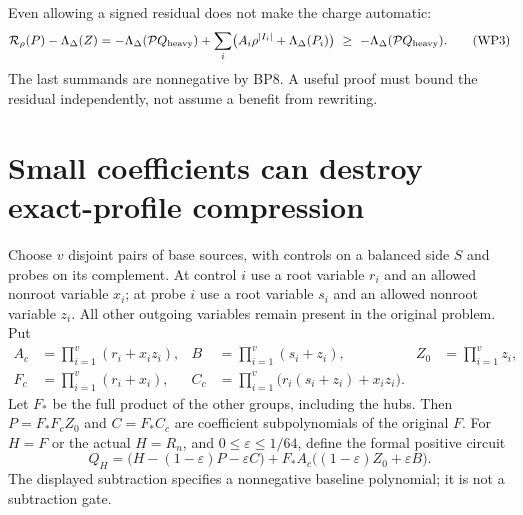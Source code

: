 \documentclass[11pt]{article}
\newcommand{\Pp}{\mathcal P}
\begin{document}
Even allowing a signed residual does not make the charge automatic:
\[
 {\cal R}_\rho(P)-\Lambda_\Delta(Z)
 =-\Lambda_\Delta(\Pp Q_{\rm heavy})
   +\sum_i\bigl(A_i\rho^{|I_i|}+\Lambda_\Delta(P_i)\bigr)
 \ \ge\ -\Lambda_\Delta(\Pp Q_{\rm heavy}).              \tag{WP3}
\]
The last summands are nonnegative by BP8. A useful proof must
bound the residual independently, not assume a benefit from rewriting.

\section{Small coefficients can destroy exact-profile compression}
Choose $v$ disjoint pairs of base sources, with controls on a balanced
side $S$ and probes on its complement. At control $i$ use a root variable
$r_i$ and an allowed nonroot variable $x_i$; at probe $i$ use a root
variable $s_i$ and an allowed nonroot variable $z_i$.
All other outgoing variables remain present in the original problem.
Put
\[
 \begin{split}
 A_c&=\prod_{i=1}^v(r_i+x_i z_i),&
 B&=\prod_{i=1}^v(s_i+z_i),&
 Z_0&=\prod_{i=1}^v z_i,\\
 F_c&=\prod_{i=1}^v(r_i+x_i),&
 C_c&=\prod_{i=1}^v\bigl(r_i(s_i+z_i)+x_i z_i\bigr).
 \end{split}                                                   \tag{WP4}
\]
Let $F_*$ be the full product of the other groups, including the hubs.
Then $P=F_*F_cZ_0$ and $C=F_*C_c$ are coefficient subpolynomials of
the original $F$. For $H=F$ or the actual $H=R_n$, and
$0\le\varepsilon\le1/64$, define the formal positive circuit
\[
 Q_H=\bigl(H-(1-\varepsilon)P-\varepsilon C\bigr)
        +F_*A_c\bigl((1-\varepsilon)Z_0+\varepsilon B\bigr).
                                                               \tag{WP5}
\]
The displayed subtraction specifies a nonnegative baseline polynomial;
it is not a subtraction gate.
\end{document}

